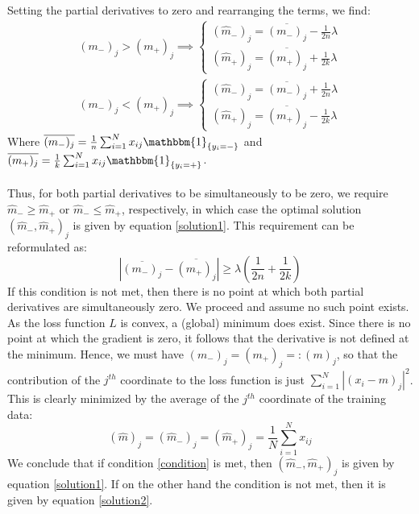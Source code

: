 \documentclass [a4paper] {report}
\begin{document}
	\noindent
	Setting the partial derivatives to zero and rearranging the terms, we find:	
	\begin{equation}
		\begin{split}
			(m_{-})_{j} > (m_{+})_{j} \implies 
				\begin{cases}
					(\hat{m}_{-})_{j} = \overline{(m_{-})_{j}} - \frac{1}{2n}\lambda\\
					(\hat{m}_{+})_{j} = \overline{(m_{+})_{j}} + \frac{1}{2k}\lambda
				\end{cases}\\
			(m_{-})_{j} < (m_{+})_{j} \implies 
				\begin{cases}
					(\hat{m}_{-})_{j} = \overline{(m_{-})_{j}} + \frac{1}{2n}\lambda\\
					(\hat{m}_{+})_{j} = \overline{(m_{+})_{j}} - \frac{1}{2k}\lambda
				\end{cases}
		\end{split}
		\label{solution1}
	\end{equation}
	Where $\overline{(m_{-})_{j}} = \frac{1}{n} \sum_{i=1}^{N} x_{ij} \mathbbm{1}_{\{y_{i}=-\}}$ and $\overline{(m_{+})_{j}} = \frac{1}{k} \sum_{i=1}^{N} x_{ij} \mathbbm{1}_{\{y_{i}=+\}}$.\\\\
	Thus, for both partial derivatives to be simultaneously to be zero, we require $\hat{m}_{-} \geq \hat{m}_{+}$ or $\hat{m}_{-} \leq \hat{m}_{+}$, respectively, in which case the optimal solution $(\hat{m}_{-},\hat{m}_{+})_{j}$ is given by equation \ref{solution1}. This requirement can be reformulated as:
	\begin{equation}
		|\overline{(m_{-})_{j}} - \overline{(m_{+})_{j}}| \geq \lambda \left(\frac{1}{2n} + \frac{1}{2k}\right)
		\label{condition}
	\end{equation}
	If this condition is not met, then there is no point at which both partial derivatives are simultaneously zero. We proceed and assume no such point exists. As the loss function $L$ is convex, a (global) minimum does exist. Since there is no point at which the gradient is zero, it follows that the derivative is not defined at the minimum. Hence, we must have $(m_{-})_{j} = (m_{+})_{j} =: (m)_{j}$, so that the contribution of the $j^{th}$ coordinate to the loss function is just $\sum_{i=1}^{N} |(x_{i} - m)_{j}|^{2}$. This is clearly minimized by the average of the $j^{th}$ coordinate of the training data:
	\begin{equation}
		(\hat{m})_{j} = (\hat{m}_{-})_{j} = (\hat{m}_{+})_{j} = \frac{1}{N}\sum_{i=1}^{N}x_{ij}
		\label{solution2}
	\end{equation}
	\noindent
	We conclude that if condition \ref{condition} is met, then $(\hat{m}_{-},\hat{m}_{+})_{j}$ is given by equation \ref{solution1}. If on the other hand the condition is not met, then it is given by equation \ref{solution2}.
	
\end{document}
